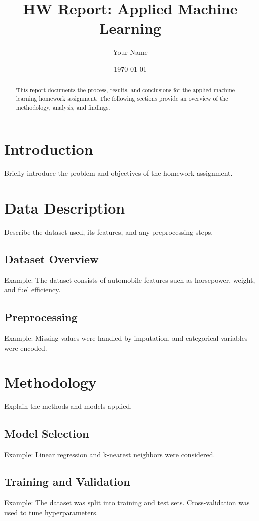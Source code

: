 \documentclass[12pt]{article}
\title{HW Report: Applied Machine Learning}
\author{Your Name}
\date{\today}
\begin{document}
\maketitle

\begin{abstract}
This report documents the process, results, and conclusions for the applied machine learning homework assignment. The following sections provide an overview of the methodology, analysis, and findings.
\end{abstract}

\section{Introduction}
Briefly introduce the problem and objectives of the homework assignment.

\section{Data Description}
Describe the dataset used, its features, and any preprocessing steps.

\subsection{Dataset Overview}
Example: The dataset consists of automobile features such as horsepower, weight, and fuel efficiency.

\subsection{Preprocessing}
Example: Missing values were handled by imputation, and categorical variables were encoded.

\section{Methodology}
Explain the methods and models applied.

\subsection{Model Selection}
Example: Linear regression and k-nearest neighbors were considered.

\subsection{Training and Validation}
Example: The dataset was split into training and test sets. Cross-validation was used to tune hyperparameters.
\end{document}
